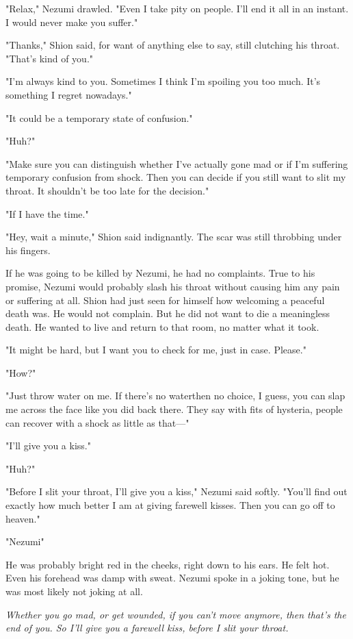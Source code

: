 "Relax," Nezumi drawled. "Even I take pity on people. I'll end it all in
an instant. I would never make you suffer."

"Thanks," Shion said, for want of anything else to say, still clutching
his throat. "That's kind of you."

"I'm always kind to you. Sometimes I think I'm spoiling you too much.
It's something I regret nowadays."

"It could be a temporary state of confusion."

"Huh?"

"Make sure you can distinguish whether I've actually gone mad or if I'm
suffering temporary confusion from shock. Then you can decide if you
still want to slit my throat. It shouldn't be too late for the
decision."

"If I have the time."

"Hey, wait a minute," Shion said indignantly. The scar was still
throbbing under his fingers.

If he was going to be killed by Nezumi, he had no complaints. True to
his promise, Nezumi would probably slash his throat without causing him
any pain or suffering at all. Shion had just seen for himself how
welcoming a peaceful death was. He would not complain. But he did not
want to die a meaningless death. He wanted to live and return to that
room, no matter what it took.

"It might be hard, but I want you to check for me, just in case.
Please."

"How?"

"Just throw water on me. If there's no water\el then no choice, I guess,
you can slap me across the face like you did back there. They say with
fits of hysteria, people can recover with a shock as little as that---"

"I'll give you a kiss."

"Huh?"

"Before I slit your throat, I'll give you a kiss," Nezumi said softly.
"You'll find out exactly how much better I am at giving farewell kisses.
Then you can go off to heaven."

"Nezumi\el "

He was probably bright red in the cheeks, right down to his ears. He
felt hot. Even his forehead was damp with sweat. Nezumi spoke in a
joking tone, but he was most likely not joking at all.

\emph{Whether you go mad, or get wounded, if you can't move anymore, then
that's the end of you. So I'll give you a farewell kiss, before I slit
your throat.}

